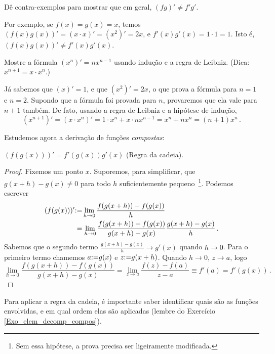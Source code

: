 \begin{exo}
Dê contra-exemplos para mostrar que em geral, $(fg)'\neq f'g'$.
\begin{sol}
Por exemplo, se $f(x)=g(x)=x$, temos $(f(x)g(x))'=(x\cdot x)'=(x^2)'=2x$,
e $f'(x)g'(x)=1\cdot 1=1$. Isto é, $(f(x)g(x))'\neq f'(x)g'(x)$.
\end{sol}
\end{exo}

\begin{exo}\label{exo_DERIV_potenciasalternat}
Mostre a fórmula $(x^n)'=nx^{n-1}$ usando indução e a regra de Leibniz. (Dica:
$x^{n+1}=x\cdot x^{n}$.)
\begin{sol}
Já sabemos que $(x)'=1$, e que $(x^2)'=2x$, o que prova a fórmula para $n=1$ e $n=2$.
Supondo que a fórmula foi provada para $n$, provaremos que ela vale para $n+1$
também.
De fato, usando a regra de Leibniz e a hipótese de indução,
\[ 
(x^{n+1})'=
(x\cdot x^n)'=1\cdot x^n+x\cdot nx^{n-1}=x^n+nx^n=(n+1)x^n\,.
\]
\end{sol}
\end{exo}

Estudemos agora a derivação de funções \emph{compostas}:
\begin{regra}
 $\boxed{(f(g(x)))'=f'(g(x))g'(x)}$ (Regra da cadeia).
\end{regra}
\begin{proof} Fixemos um ponto $x$.
Suporemos, para simplificar, que $g(x+h)-g(x)\neq 0$ para todo $h$ suficientemente
pequeno~\footnote{Sem essa hipótese, a prova precisa ser ligeiramente modificada.}.
Podemos escrever
\begin{align}
(f(g(x)))'&{:=} \lim_{h\to 0}\frac{f(g(x+h))-f(g(x))}{h}\nonumber\\
&=\lim_{h\to
0}\frac{f(g(x+h))-f(g(x))}{g(x+h)-g(x)}{\frac{g(x+h)-g(x)}{h}}\,.\label{multdivgzero}
\end{align}
Sabemos que o segundo 
termo $\frac{g(x+h)-g(x)}{h}\to g'(x)$ quando $h\to 0$.
Para o
primeiro termo chamemos $a{:=} g(x)$ e $z{:=} g(x+h)$. Quando $h\to
0$, $z\to a$, logo
$$
\lim_{h\to
0}\frac{f(g(x+h))-f(g(x))}{g(x+h)-g(x)}=\lim_{z\to
a}\frac{f(z)-f(a)}{z-a}\equiv f'(a)=f'(g(x))\,.
$$
\end{proof}

Para aplicar a regra da cadeia, é importante saber identificar quais são as funções
envolvidas, e em qual ordem elas são aplicadas (lembre do Exercício
\ref{Exo_elem_decomp_compos}).

